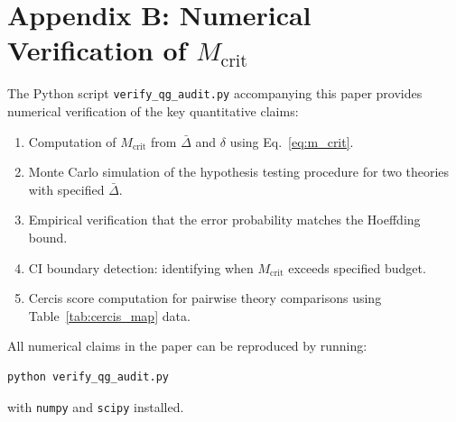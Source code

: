 \documentclass[12pt,a4paper]{article}
\theoremstyle{remark}
\newcommand{\Cercis}{\textsf{Cercis}}
\newcommand{\CI}{\textsf{CI}}
\begin{document}
\section*{Appendix B: Numerical Verification of $M_{\text{crit}}$}
\label{app:numerical}

The Python script \texttt{verify\_qg\_audit.py} accompanying this paper provides numerical verification of the key quantitative claims:

\begin{enumerate}[leftmargin=*, label=(\arabic*)]
  \item Computation of $M_{\text{crit}}$ from $\bar{\Delta}$ and $\delta$ using Eq.~\eqref{eq:m_crit}.
  \item Monte Carlo simulation of the hypothesis testing procedure for two theories with specified $\bar{\Delta}$.
  \item Empirical verification that the error probability matches the Hoeffding bound.
  \item \CI{} boundary detection: identifying when $M_{\text{crit}}$ exceeds specified budget.
  \item \Cercis{} score computation for pairwise theory comparisons using Table~\ref{tab:cercis_map} data.
\end{enumerate}

All numerical claims in the paper can be reproduced by running:
\begin{verbatim}
python verify_qg_audit.py
\end{verbatim}
with \texttt{numpy} and \texttt{scipy} installed.
\end{document}
